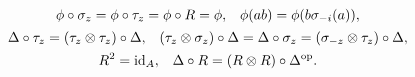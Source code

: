   \begin{gather}
    \begin{aligned} \label{eq:modular}
      \phi\circ \sigma_{z} &= \phi \circ \tau_{z} = \phi \circ R =
      \phi, & \phi(ab) &= \phi(b\sigma_{-i}(a)),
    \end{aligned}
\\ \label{eq:scaling-modular-delta}
    \begin{aligned} 
    \Delta \circ \tau_{z} &= (\tau_{z} \otimes \tau_{z}) \circ \Delta,
    & (\tau_{z} \otimes \sigma_{z}) \circ \Delta &= \Delta \circ
    \sigma_{z} = (\sigma_{-z} \otimes \tau_{z}) \circ \Delta,      
  \end{aligned} \\
  \begin{aligned} \label{eq:unitary-antipode}
    R^{2} &= \operatorname{id}_{A}, & \Delta \circ R &= (R \otimes R) \circ
    \Delta^{\operatorname{\mathrm{op}}}.
  \end{aligned}
  \end{gather}






  

